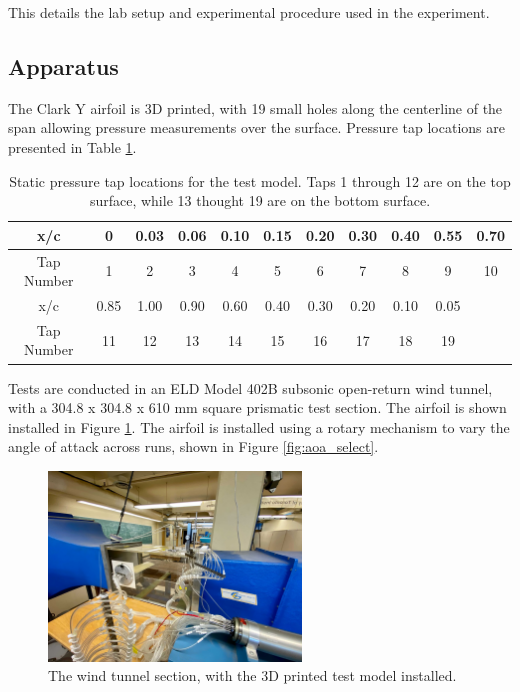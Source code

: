 \documentclass[runningheads]{llncs}
\begin{document}
This details the lab setup and experimental procedure used in the experiment.

\subsection{Apparatus}
The Clark Y airfoil is 3D printed, with 19 small holes along the centerline of the span allowing pressure measurements over the surface. Pressure tap locations are presented in Table \ref{tab:pressure_taps}.

\begin{table}
    \centering
    \begin{tabular}{|c||c|c|c|c|c|c|c|c|c|c|}\hline
        x/c & 0 & 0.03 & 0.06 & 0.10 & 0.15 & 0.20 & 0.30 & 0.40 & 0.55 & 0.70 \\\hline
        Tap Number & 1 & 2 & 3 & 4 & 5 & 6 & 7 & 8 & 9 & 10\\\hline \hline
        x/c & 0.85 & 1.00 & 0.90 & 0.60 & 0.40 & 0.30 & 0.20 & 0.10 & 0.05&\\\hline
        Tap Number & 11 & 12 & 13 & 14 & 15 & 16 & 17 & 18 & 19&\\\hline
    \end{tabular}
    \caption{Static pressure tap locations for the test model. Taps 1 through 12 are on the top surface, while 13 thought 19 are on the bottom surface.}
    \label{tab:pressure_taps}
\end{table}

Tests are conducted in an ELD Model 402B subsonic open-return wind tunnel, with a 304.8 x 304.8 x 610 mm  square prismatic test section. The airfoil is shown installed in Figure \ref{fig:wind_tunnel_setup}. The airfoil is installed using a rotary mechanism to vary the angle of attack across runs, shown in Figure \ref{fig:aoa_select}.

\begin{figure}
    \centering
    \includegraphics[width=0.6\textwidth]{Apparatus Pictures/wind_tunnel_setup.jpg}
    \caption{The wind tunnel section, with the 3D printed test model installed.}
    \label{fig:wind_tunnel_setup}
\end{figure}
\end{document}
